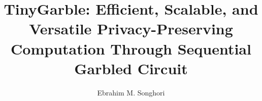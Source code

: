 \documentclass[12pt]{ruthesis}
\title{TinyGarble: Efficient, Scalable, and Versatile Privacy-Preserving Computation Through Sequential Garbled Circuit}
\author{Ebrahim M. Songhori}
\begin{document}
  \begin{frontmatter}
   \maketitle
   
   
   \tableofcontents
   \listoffigures
   \listoftables
   
  \end{frontmatter}











\appendices




\end{document}
